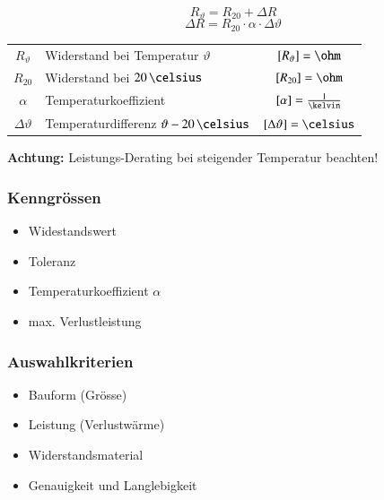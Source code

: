 \begin{minipage}[c]{0.3\columnwidth}
    $$ \boxed{R_{\vartheta} = R_{20} + \Delta R} $$
    $$ \boxed{\Delta R = R_{20} \cdot \alpha \cdot \Delta \vartheta} $$
\end{minipage}
\hfill
\begin{minipage}[c]{0.68\columnwidth}
    \begin{tabular}{c l c}
        $R_{\vartheta}$     & Widerstand bei Temperatur $\vartheta$             & $[R_{\vartheta}] = \ohm$ \\
        $R_{20}$            & Widerstand bei $20 \, \celsius$                   & $[R_{20}] = \ohm$ \\
        $\alpha$            & Temperaturkoeffizient                             & $[\alpha] = \frac{1}{\kelvin}$\\
        $\Delta \vartheta$  & Temperaturdifferenz $\vartheta - 20 \, \celsius$  & $[\Delta \vartheta] = \celsius$\\
    \end{tabular}
\end{minipage}

\vspace{0.2cm}
\textbf{Achtung:} Leistungs-Derating bei steigender Temperatur beachten!


\begin{minipage}[t]{0.48\columnwidth}
    \subsubsection{Kenngrössen}

    \begin{itemize}
        \item Widestandswert
        \item Toleranz
        \item Temperaturkoeffizient $\alpha$
        \item max. Verlustleistung
    \end{itemize}
\end{minipage}
\hfill
\begin{minipage}[t]{0.48\columnwidth}
    \subsubsection{Auswahlkriterien}
    
    \begin{itemize}
        \item Bauform (Grösse)
        \item Leistung (Verlustwärme)
        \item Widerstandsmaterial
        \item Genauigkeit und Langlebigkeit
    \end{itemize}
\end{minipage}


